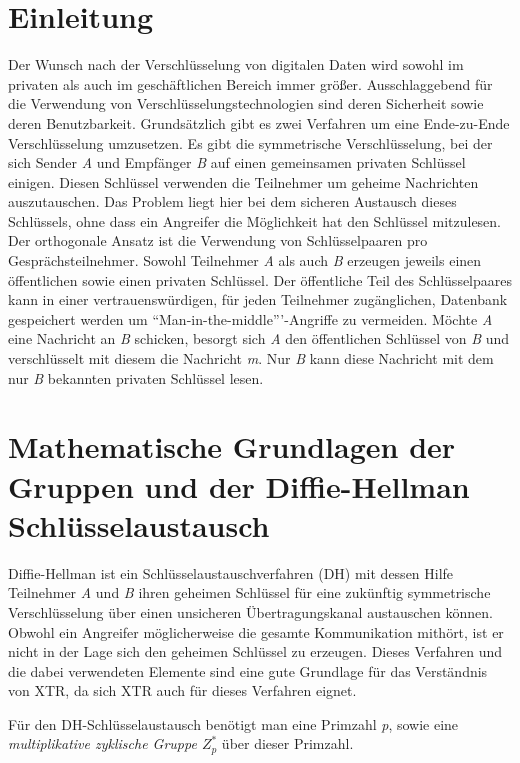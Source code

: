 \documentclass[10pt,        %
               a4paper,     %
               journal,     %
               ]{IEEEtran}
\begin{document}
\section{Einleitung}
\label{sec:einleitung}
Der Wunsch nach der Verschlüsselung von digitalen Daten wird sowohl im privaten als auch im geschäftlichen Bereich immer größer.
Ausschlaggebend für die Verwendung von Verschlüsselungstechnologien sind deren Sicherheit sowie deren Benutzbarkeit.
Grundsätzlich gibt es zwei Verfahren um eine Ende-zu-Ende Verschlüsselung umzusetzen.
Es gibt die symmetrische Verschlüsselung, bei der sich Sender \emph{A} und Empfänger \emph{B} auf einen gemeinsamen privaten Schlüssel einigen. Diesen Schlüssel verwenden die Teilnehmer um geheime Nachrichten auszutauschen. Das Problem liegt hier bei dem sicheren Austausch dieses Schlüssels, ohne dass ein Angreifer die Möglichkeit hat den Schlüssel mitzulesen. Der orthogonale Ansatz ist die Verwendung von Schlüsselpaaren pro Gesprächsteilnehmer. Sowohl Teilnehmer \emph{A} als auch \emph{B} erzeugen jeweils einen öffentlichen sowie einen privaten Schlüssel. Der öffentliche Teil des Schlüsselpaares kann in einer vertrauenswürdigen, für jeden Teilnehmer zugänglichen, Datenbank gespeichert werden um "`Man-in-the-middle"''-Angriffe zu vermeiden. Möchte \emph{A} eine Nachricht an \emph{B} schicken, besorgt sich \emph{A} den öffentlichen Schlüssel von \emph{B} und verschlüsselt mit diesem die Nachricht \emph{m}. Nur \emph{B} kann diese Nachricht mit dem nur \emph{B} bekannten privaten Schlüssel lesen.

\section{Mathematische Grundlagen der Gruppen und der Diffie-Hellman Schlüsselaustausch}
\label{sec:dh}
Diffie-Hellman ist ein Schlüsselaustauschverfahren (DH) mit dessen Hilfe Teilnehmer \emph{A} und \emph{B} ihren geheimen Schlüssel für eine zukünftig symmetrische Verschlüsselung über einen unsicheren Übertragungskanal austauschen können. Obwohl ein Angreifer möglicherweise die gesamte Kommunikation mithört, ist er nicht in der Lage sich den geheimen Schlüssel zu erzeugen. Dieses Verfahren und die dabei verwendeten Elemente sind eine
gute Grundlage für das Verständnis von XTR, da sich XTR auch für dieses Verfahren eignet.

Für den DH-Schlüsselaustausch benötigt man eine Primzahl \emph{p}, sowie eine \emph{multiplikative zyklische Gruppe $Z_p^*$} über dieser Primzahl.
\end{document}
